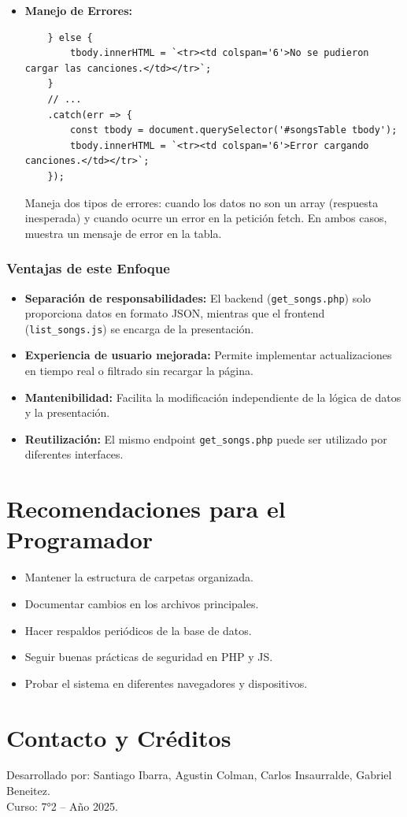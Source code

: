 \documentclass[a4paper,12pt]{article}
\begin{document}
\begin{itemize}
    \item \textbf{Manejo de Errores:}
    \begin{verbatim}
    } else {
        tbody.innerHTML = `<tr><td colspan='6'>No se pudieron cargar las canciones.</td></tr>`;
    }
    // ...
    .catch(err => {
        const tbody = document.querySelector('#songsTable tbody');
        tbody.innerHTML = `<tr><td colspan='6'>Error cargando canciones.</td></tr>`;
    });
    \end{verbatim}
    Maneja dos tipos de errores: cuando los datos no son un array (respuesta inesperada) y cuando ocurre un error en la petición fetch. En ambos casos, muestra un mensaje de error en la tabla.
\end{itemize}

\subsubsection{Ventajas de este Enfoque}
\begin{itemize}
    \item \textbf{Separación de responsabilidades:} El backend (\texttt{get\_songs.php}) solo proporciona datos en formato JSON, mientras que el frontend (\texttt{list\_songs.js}) se encarga de la presentación.
    \item \textbf{Experiencia de usuario mejorada:} Permite implementar actualizaciones en tiempo real o filtrado sin recargar la página.
    \item \textbf{Mantenibilidad:} Facilita la modificación independiente de la lógica de datos y la presentación.
    \item \textbf{Reutilización:} El mismo endpoint \texttt{get\_songs.php} puede ser utilizado por diferentes interfaces.
\end{itemize}

\section{Recomendaciones para el Programador}
\begin{itemize}
    \item Mantener la estructura de carpetas organizada.
    \item Documentar cambios en los archivos principales.
    \item Hacer respaldos periódicos de la base de datos.
    \item Seguir buenas prácticas de seguridad en PHP y JS.
    \item Probar el sistema en diferentes navegadores y dispositivos.
\end{itemize}

\section{Contacto y Créditos}
Desarrollado por: Santiago Ibarra, Agustin Colman, Carlos Insaurralde, Gabriel Beneitez.\\
Curso: 7°2 -- Año 2025.
\end{document}
